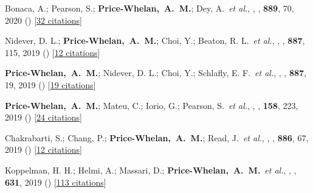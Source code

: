 \item[{\color{deemph}\scriptsize59}]Bonaca, A.; Pearson, S.; \textbf{Price-Whelan,~A.~M.}; Dey, A.~\textit{et al.}, , \apj, \textbf{889}, 70, 2020 () [\href{http://adsabs.harvard.edu/abs/2020ApJ...889...70B}{32 citations}]

\item[{\color{deemph}\scriptsize58}]Nidever, D. L.; \textbf{Price-Whelan,~A.~M.}; Choi, Y.; Beaton, R. L.~\textit{et al.}, , \apj, \textbf{887}, 115, 2019 () [\href{http://adsabs.harvard.edu/abs/2019ApJ...887..115N}{12 citations}]

\item[{\color{deemph}\scriptsize57}]\textbf{Price-Whelan,~A.~M.}; Nidever, D. L.; Choi, Y.; Schlafly, E. F.~\textit{et al.}, , \apj, \textbf{887}, 19, 2019 () [\href{http://adsabs.harvard.edu/abs/2019ApJ...887...19P}{19 citations}]

\item[{\color{deemph}\scriptsize56}]\textbf{Price-Whelan,~A.~M.}; Mateu, C.; Iorio, G.; Pearson, S.~\textit{et al.}, , \aj, \textbf{158}, 223, 2019 () [\href{http://adsabs.harvard.edu/abs/2019AJ....158..223P}{24 citations}]

\item[{\color{deemph}\scriptsize55}]Chakrabarti, S.; Chang, P.; \textbf{Price-Whelan,~A.~M.}; Read, J.~\textit{et al.}, , \apj, \textbf{886}, 67, 2019 () [\href{http://adsabs.harvard.edu/abs/2019ApJ...886...67C}{12 citations}]

\item[{\color{deemph}\scriptsize54}]Koppelman, H. H.; Helmi, A.; Massari, D.; \textbf{Price-Whelan,~A.~M.}~\textit{et al.}, , \aanda, \textbf{631}, 2019 () [\href{http://adsabs.harvard.edu/abs/2019A&A...631L...9K}{113 citations}]

